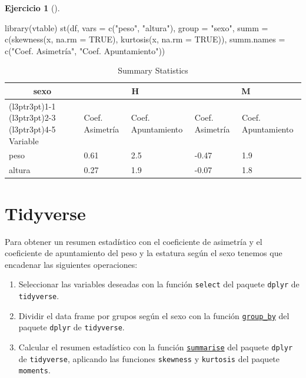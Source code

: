 \documentclass[
  a4paper,
]{scrreport}
\newenvironment{Shaded}{\begin{snugshade}}{\end{snugshade}}
\newcommand{\AttributeTok}[1]{\textcolor[rgb]{0.40,0.45,0.13}{#1}}
\newcommand{\FunctionTok}[1]{\textcolor[rgb]{0.28,0.35,0.67}{#1}}
\newcommand{\NormalTok}[1]{\textcolor[rgb]{0.00,0.23,0.31}{#1}}
\newcommand{\StringTok}[1]{\textcolor[rgb]{0.13,0.47,0.30}{#1}}
\providecommand{\tightlist}{%
  \setlength{\itemsep}{0pt}\setlength{\parskip}{0pt}}\usepackage{longtable,booktabs,array}
\theoremstyle{definition}
\newtheorem{exercise}{Ejercicio}[chapter]
\theoremstyle{remark}
\begin{document}
\begin{exercise}[]
\begin{enumerate}
\begin{tcolorbox}
\begin{Shaded}
\begin{Highlighting}[]
\FunctionTok{library}\NormalTok{(vtable)}
\FunctionTok{st}\NormalTok{(df, }\AttributeTok{vars =} \FunctionTok{c}\NormalTok{(}\StringTok{"peso"}\NormalTok{, }\StringTok{"altura"}\NormalTok{), }\AttributeTok{group =} \StringTok{"sexo"}\NormalTok{, }\AttributeTok{summ =} \FunctionTok{c}\NormalTok{(}\StringTok{\textquotesingle{}skewness(x, na.rm = TRUE)\textquotesingle{}}\NormalTok{, }\StringTok{\textquotesingle{}kurtosis(x, na.rm = TRUE)\textquotesingle{}}\NormalTok{),}
\AttributeTok{summ.names =} \FunctionTok{c}\NormalTok{(}\StringTok{"Coef. Asimetría"}\NormalTok{, }\StringTok{"Coef. Apuntamiento"}\NormalTok{))}
\end{Highlighting}
\end{Shaded}

  \begin{table}

  \caption{Summary Statistics}
  \centering
  \begin{tabular}[t]{lllll}
  \toprule
  \multicolumn{1}{c}{sexo} & \multicolumn{2}{c}{H} & \multicolumn{2}{c}{M} \\
  \cmidrule(l{3pt}r{3pt}){1-1} \cmidrule(l{3pt}r{3pt}){2-3} \cmidrule(l{3pt}r{3pt}){4-5}
  Variable & Coef. Asimetría & Coef. Apuntamiento & Coef. Asimetría & Coef. Apuntamiento\\
  \midrule
  peso & 0.61 & 2.5 & -0.47 & 1.9\\
  altura & 0.27 & 1.9 & -0.07 & 1.8\\
  \bottomrule
  \end{tabular}
  \end{table}

  \section{Tidyverse}

  Para obtener un resumen estadístico con el coeficiente de asimetría y
  el coeficiente de apuntamiento del peso y la estatura según el sexo
  tenemos que encadenar las siguientes operaciones:

  \begin{enumerate}
  \def\labelenumii{\arabic{enumii}.}
  \tightlist
  \item
    Seleccionar las variables deseadas con la función \texttt{select}
    del paquete \texttt{dplyr} de \texttt{tidyverse}.
  \item
    Dividir el data frame por grupos según el sexo con la función
    \href{https://dplyr.tidyverse.org/reference/group_by.html}{\texttt{group\_by}}
    del paquete \texttt{dplyr} de \texttt{tidyverse}.
  \item
    Calcular el resumen estadístico con la función
    \href{https://dplyr.tidyverse.org/reference/summarise.html}{\texttt{summarise}}
    del paquete \texttt{dplyr} de \texttt{tidyverse}, aplicando las
    funciones \texttt{skewness} y \texttt{kurtosis} del paquete
    \texttt{moments}.
  \end{enumerate}


\end{tcolorbox}
\end{enumerate}
\end{exercise}
\end{document}
